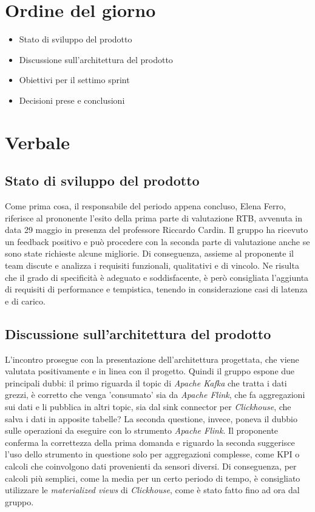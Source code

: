 \documentclass[italian,12pt]{article}
\begin{document}
\section{Ordine del giorno}
\begin{itemize}
	\item Stato di sviluppo del prodotto
	\item Discussione sull'architettura del prodotto
	\item Obiettivi per il settimo sprint
	\item Decisioni prese e conclusioni
\end{itemize}

\newpage

\section{Verbale}

\subsection{Stato di sviluppo del prodotto}
Come prima cosa, il responsabile del periodo appena concluso, Elena Ferro, riferisce al prononente l'esito della prima parte di valutazione RTB,
avvenuta in data 29 maggio in presenza del professore Riccardo Cardin. Il gruppo ha ricevuto un feedback positivo e può procedere con la seconda
parte di valutazione anche se sono state richieste alcune migliorie. Di conseguenza, assieme al proponente il team discute e analizza
i requisiti funzionali, qualitativi e di vincolo. Ne risulta che il grado di specificità è adeguato e soddisfacente, è però consigliata l'aggiunta 
di requisiti di performance e tempistica, tenendo in considerazione casi di latenza e di carico.

\subsection{Discussione sull'architettura del prodotto}
L'incontro prosegue con la presentazione dell'architettura progettata, che viene valutata positivamente e in linea con il progetto.
Quindi il gruppo espone due principali dubbi: il primo riguarda il topic di \textit{Apache Kafka} che tratta i dati grezzi, è corretto che venga 'consumato' sia da \textit{Apache Flink},
che fa aggregazioni sui dati e li pubblica in altri topic, sia dal sink connector per \textit{Clickhouse}, che salva i dati in apposite tabelle?
La seconda questione, invece, poneva il dubbio sulle operazioni da eseguire con lo strumento \textit{Apache Flink}. Il proponente conferma la correttezza della
prima domanda e riguardo la seconda suggerisce l'uso dello strumento in questione solo per aggregazioni complesse, come KPI o calcoli che coinvolgono dati provenienti
da sensori diversi. Di conseguenza, per calcoli più semplici, come la media per un certo periodo di tempo, è consigliato utilizzare le \textit{materialized views} di \textit{Clickhouse},
come è stato fatto fino ad ora dal gruppo.
\end{document}
